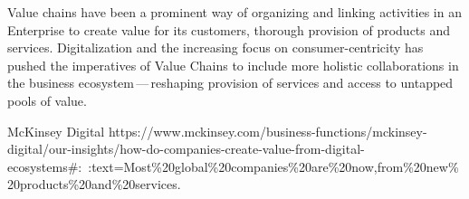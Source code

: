 %
%

Value chains have been a prominent way of organizing and linking activities in an Enterprise to create value
for its customers, thorough provision of products and services.
Digitalization and the increasing focus on consumer-centricity
has pushed the imperatives of Value Chains to include more holistic collaborations in the
business ecosystem\,---\,reshaping provision of services and access to untapped pools of value.

{McKinsey Digital}
{https://www.mckinsey.com/business-functions/mckinsey-digital/our-insights/how-do-companies-create-value-from-digital-ecosystems\#:~:text=Most\%20global\%20companies\%20are\%20now,from\%20new\%20products\%20and\%20services.}



